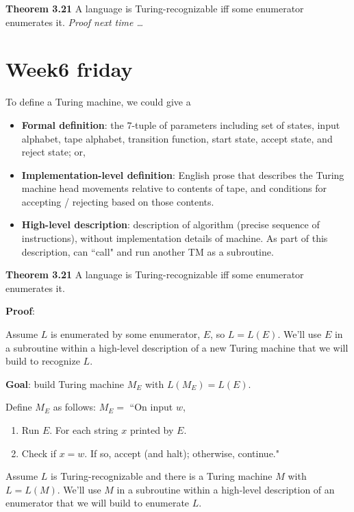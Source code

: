 \documentclass[12pt, oneside]{article}
\begin{document}
\vfill 

{\bf Theorem 3.21} A language is Turing-recognizable iff some enumerator enumerates it.
{\it Proof next time \ldots } \vfill
\section*{Week6 friday}



To define a Turing machine, we could give a 
\begin{itemize}
\item {\bf Formal definition}: the $7$-tuple of parameters including set of states, 
input alphabet, tape alphabet, transition function, start state, accept state, and reject state; or,
\item {\bf Implementation-level definition}: English prose that describes the Turing machine head 
movements relative to contents of tape, and conditions for accepting / rejecting based on those contents.
\item {\bf High-level description}: description of algorithm (precise sequence of instructions), 
without implementation details of machine. As part of this description, can ``call" and run 
another TM as a subroutine.
\end{itemize}


{\bf Theorem 3.21} A language is Turing-recognizable iff some enumerator enumerates it.

{\bf Proof}:

Assume $L$ is enumerated by some enumerator, $E$, so $L = L(E)$.
We'll use $E$ in a subroutine
within a high-level description of a new Turing machine that we will build to recognize $L$.

{\bf Goal}: build Turing machine $M_E$ with $L(M_E) = L(E)$.

Define $M_E$ as follows: $M_E = $ ``On input $w$,
\begin{enumerate}
\item Run $E$. For each string $x$ printed by $E$.
\item \qquad Check if $x = w$. If so, accept (and halt); otherwise, continue."
\end{enumerate}


\vfill 



Assume $L$ is Turing-recognizable and there 
is a Turing  machine  $M$ with  $L = L(M)$. We'll use $M$ in a subroutine
within a high-level description of an enumerator that we will build to enumerate $L$.
\end{document}
